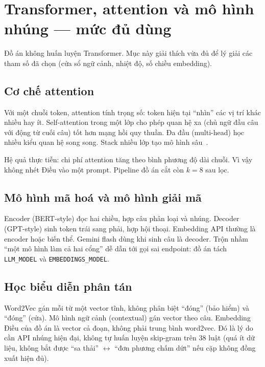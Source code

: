 
\section{Transformer, attention và mô hình nhúng --- mức đủ dùng}

Đồ án không huấn luyện Transformer. Mục này giải thích vừa đủ để lý giải các
tham số đã chọn (cửa sổ ngữ cảnh, nhiệt độ, số chiều embedding).

\subsection{Cơ chế attention}

Với một chuỗi token, attention tính trọng số: token hiện tại ``nhìn'' các vị trí
khác nhiều hay ít. Self-attention trong một lớp cho phép quan hệ xa (chủ ngữ
đầu câu với động từ cuối câu) tốt hơn mạng hồi quy thuần. Đa đầu (multi-head)
học nhiều kiểu quan hệ song song. Stack nhiều lớp tạo mô hình sâu~\cite{vaswani2017}.

Hệ quả thực tiễn: chi phí attention tăng theo bình phương độ dài chuỗi. Vì vậy
không nhét \soDieu{} Điều vào một prompt. Pipeline đồ án cắt còn $k=8$ sau lọc.

\subsection{Mô hình mã hoá và mô hình giải mã}

Encoder (BERT-style) đọc hai chiều, hợp câu phân loại và nhúng. Decoder
(GPT-style) sinh token trái sang phải, hợp hội thoại. Embedding API thường là
encoder hoặc biến thể. Gemini flash dùng khi sinh câu là decoder. Trộn nhầm
``một mô hình làm cả hai cổng'' dễ dẫn tới gọi sai endpoint: đồ án tách
\texttt{LLM\_MODEL} và \texttt{EMBEDDINGS\_MODEL}.

\subsection{Học biểu diễn phân tán}

Word2Vec gán mỗi từ một vector tĩnh, không phân biệt ``đóng'' (bảo hiểm) và
``đóng'' (cửa). Mô hình ngữ cảnh (contextual) gán vector theo câu. Embedding
Điều của đồ án là vector cả đoạn, không phải trung bình word2vec. Đó là lý do
cần API nhúng hiện đại, không tự huấn luyện skip-gram trên 38 luật (quá ít dữ
liệu, không bắt được ``sa thải'' $\leftrightarrow$ ``đơn phương chấm dứt'' nếu
cặp không đồng xuất hiện đủ).

